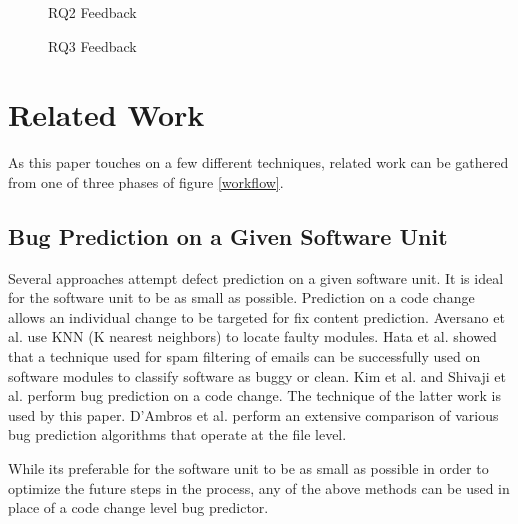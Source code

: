 \documentclass[conference]{IEEEtran}
\begin{document}
\begin{figure}
	\caption{RQ2 Feedback}
	\label{Suggester_RQ1_Results}
\end{figure}

\begin{figure}
	\caption{RQ3 Feedback}
	\label{Suggester_RQ2_Results}
\end{figure}

\section{Related Work}
\label{RelatedWork}

\par As this paper touches on a few different techniques, related work can be gathered from one of three phases of figure \ref{workflow}. 


\subsection{Bug Prediction on a Given Software Unit} 
\par Several approaches attempt defect prediction on a given software unit. It is ideal for the software unit to be as small as possible. Prediction on a code change allows an individual change to be targeted for fix content prediction. Aversano et al. \cite{aversano2007lbi} use KNN (K nearest neighbors) to locate faulty modules.  Hata et al. \cite{Hata2008} showed that a technique used for spam filtering of emails can be successfully used on software modules to classify software as buggy or clean. Kim et al. \cite{Kim2007p58} and Shivaji et al. \cite{DBLP:journals/tse/ShivajiWAK13} perform bug prediction on a code change. The technique of the latter work is used by this paper. D'Ambros et al. \cite{d2011evaluating} perform an extensive comparison of various bug prediction algorithms that operate at the file level.

\par While its preferable for the software unit to be as small as possible in order to optimize the future steps in the process, any of the above methods can be used in place of a code change level bug predictor.
\end{document}
